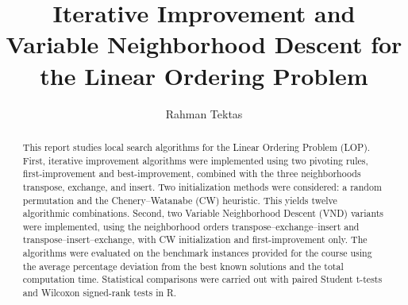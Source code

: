 \documentclass[sigconf,nonacm]{acmart}
\begin{document}
\title{
	{Iterative Improvement and Variable Neighborhood Descent for the Linear Ordering Problem}
}

\author{Rahman Tektas}
 




\begin{abstract}
This report studies local search algorithms for the Linear Ordering Problem (LOP). First, iterative improvement algorithms were implemented using two pivoting rules, first-improvement and best-improvement, combined with the three neighborhoods transpose, exchange, and insert. Two initialization methods were considered: a random permutation and the Chenery–Watanabe (CW) heuristic. This yields twelve algorithmic combinations. Second, two Variable Neighborhood Descent (VND) variants were implemented, using the neighborhood orders transpose–exchange–insert and transpose–insert–exchange, with CW initialization and first-improvement only. The algorithms were evaluated on the benchmark instances provided for the course using the average percentage deviation from the best known solutions and the total computation time. Statistical comparisons were carried out with paired Student t-tests and Wilcoxon signed-rank tests in R. 
\end{abstract}

\maketitle






 



\end{document}
